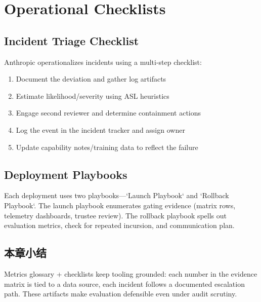 \section{Operational Checklists}

\subsection{Incident Triage Checklist}

Anthropic operationalizes incidents using a multi-step checklist:

\begin{enumerate}
    \item Document the deviation and gather log artifacts
    \item Estimate likelihood/severity using ASL heuristics
    \item Engage second reviewer and determine containment actions
    \item Log the event in the incident tracker and assign owner
    \item Update capability notes/training data to reflect the failure
\end{enumerate}

\subsection{Deployment Playbooks}

Each deployment uses two playbooks—`Launch Playbook` and `Rollback Playbook`. The launch playbook enumerates gating evidence (matrix rows, telemetry dashboards, trustee review). The rollback playbook spells out evaluation metrics, check for repeated incursion, and communication plan.

\subsection{本章小结}

Metrics glossary + checklists keep tooling grounded: each number in the evidence matrix is tied to a data source, each incident follows a documented escalation path. These artifacts make evaluation defensible even under audit scrutiny.

